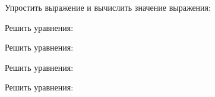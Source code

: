\begin{enumcols}[label=\textbf{\arabic*.}]
	\item {}
	\item {}
	\item {}
	\item {}
	\item Упростить выражение и вычислить значение выражения:
	\begin{enumcols}[itemcolumns=1]
		\item {}
		\item {}
		\item {}
		\item {}
	\end{enumcols}
	\item {}
	\item {}
	\item {}
	\item {}
	\item {}
	\item {}
	\item {}
	\item {}
	\item Решить уравнения:
	\begin{enumcols}[itemcolumns=1]
		\item {}
		\item {}
		\item {}
		\item {}
		\item {}
		\item {}
	\end{enumcols}
	\item Решить уравнения:
	\begin{enumcols}[itemcolumns=1]
		\item {}
		\item {}
	\end{enumcols}
	\item Решить уравнения:
	\begin{enumcols}[itemcolumns=1]
		\item {}
		\item {}
		\item {}
	\end{enumcols}
	\item Решить уравнения:
	\begin{enumcols}[itemcolumns=1]
		\item {}
		\item {}
		\item {}
		\item {}
		\item {}
	\end{enumcols}
	\item {}
	\item {}
	\item {}
\end{enumcols}